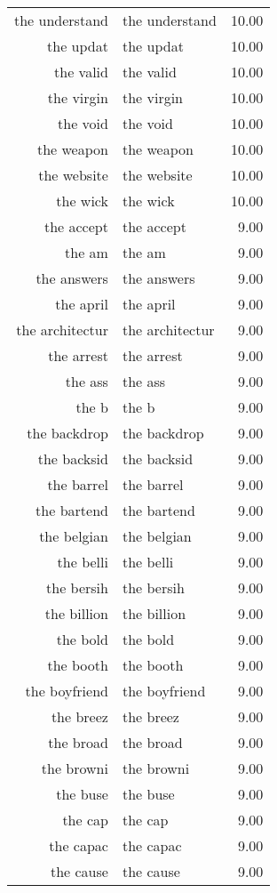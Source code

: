 \begin{table}[ht]
\begin{tabular}{rlr}
  the understand & the understand & 10.00 \\ 
  the updat & the updat & 10.00 \\ 
  the valid & the valid & 10.00 \\ 
  the virgin & the virgin & 10.00 \\ 
  the void & the void & 10.00 \\ 
  the weapon & the weapon & 10.00 \\ 
  the website & the website & 10.00 \\ 
  the wick & the wick & 10.00 \\ 
  the accept & the accept & 9.00 \\ 
  the am & the am & 9.00 \\ 
  the answers & the answers & 9.00 \\ 
  the april & the april & 9.00 \\ 
  the architectur & the architectur & 9.00 \\ 
  the arrest & the arrest & 9.00 \\ 
  the ass & the ass & 9.00 \\ 
  the b & the b & 9.00 \\ 
  the backdrop & the backdrop & 9.00 \\ 
  the backsid & the backsid & 9.00 \\ 
  the barrel & the barrel & 9.00 \\ 
  the bartend & the bartend & 9.00 \\ 
  the belgian & the belgian & 9.00 \\ 
  the belli & the belli & 9.00 \\ 
  the bersih & the bersih & 9.00 \\ 
  the billion & the billion & 9.00 \\ 
  the bold & the bold & 9.00 \\ 
  the booth & the booth & 9.00 \\ 
  the boyfriend & the boyfriend & 9.00 \\ 
  the breez & the breez & 9.00 \\ 
  the broad & the broad & 9.00 \\ 
  the browni & the browni & 9.00 \\ 
  the buse & the buse & 9.00 \\ 
  the cap & the cap & 9.00 \\ 
  the capac & the capac & 9.00 \\ 
  the cause & the cause & 9.00 \\ 

\end{tabular}
\end{table}
